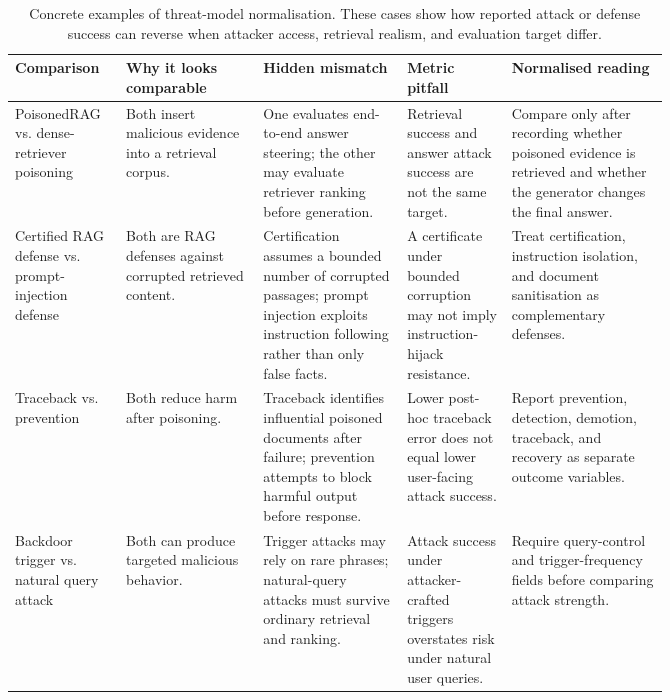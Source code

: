 \begin{table}[t]
\centering
\scriptsize
\renewcommand{\arraystretch}{0.88}
\begin{tabularx}{\linewidth}{>{\raggedright\arraybackslash}p{0.17\linewidth}>{\raggedright\arraybackslash}p{0.21\linewidth}>{\raggedright\arraybackslash}p{0.22\linewidth}>{\raggedright\arraybackslash}p{0.16\linewidth}X}
\toprule
\textbf{Comparison} & \textbf{Why it looks comparable} & \textbf{Hidden mismatch} & \textbf{Metric pitfall} & \textbf{Normalised reading} \\
\midrule
PoisonedRAG vs. dense-retriever poisoning & Both insert malicious evidence into a retrieval corpus. & One evaluates end-to-end answer steering; the other may evaluate retriever ranking before generation. & Retrieval success and answer attack success are not the same target. & Compare only after recording whether poisoned evidence is retrieved and whether the generator changes the final answer. \\
Certified RAG defense vs. prompt-injection defense & Both are RAG defenses against corrupted retrieved content. & Certification assumes a bounded number of corrupted passages; prompt injection exploits instruction following rather than only false facts. & A certificate under bounded corruption may not imply instruction-hijack resistance. & Treat certification, instruction isolation, and document sanitisation as complementary defenses. \\
Traceback vs. prevention & Both reduce harm after poisoning. & Traceback identifies influential poisoned documents after failure; prevention attempts to block harmful output before response. & Lower post-hoc traceback error does not equal lower user-facing attack success. & Report prevention, detection, demotion, traceback, and recovery as separate outcome variables. \\
Backdoor trigger vs. natural query attack & Both can produce targeted malicious behavior. & Trigger attacks may rely on rare phrases; natural-query attacks must survive ordinary retrieval and ranking. & Attack success under attacker-crafted triggers overstates risk under natural user queries. & Require query-control and trigger-frequency fields before comparing attack strength. \\
\bottomrule
\end{tabularx}
\caption{Concrete examples of threat-model normalisation. These cases show how reported attack or defense success can reverse when attacker access, retrieval realism, and evaluation target differ.}
\label{tab:threat-model-examples}
\end{table}

